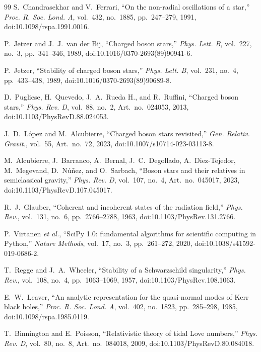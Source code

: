 \documentclass[aps,prd,preprint,onecolumn,nofootinbib,superscriptaddress,showkeys]{revtex4-2}
\begin{document}
\begin{thebibliography}{99}
S.~Chandrasekhar and V.~Ferrari,
``On the non-radial oscillations of a star,''
\emph{Proc. R. Soc. Lond. A}, vol.~432, no.~1885, pp.~247--279, 1991,
doi:10.1098/rspa.1991.0016.

P.~Jetzer and J.~J.~van der Bij,
``Charged boson stars,''
\emph{Phys. Lett. B}, vol.~227, no.~3, pp.~341--346, 1989,
doi:10.1016/0370-2693(89)90941-6.

P.~Jetzer,
``Stability of charged boson stars,''
\emph{Phys. Lett. B}, vol.~231, no.~4, pp.~433--438, 1989,
doi:10.1016/0370-2693(89)90689-8.

D.~Pugliese, H.~Quevedo, J.~A.~Rueda H., and R.~Ruffini,
``Charged boson stars,''
\emph{Phys. Rev. D}, vol.~88, no.~2, Art.~no.~024053, 2013,
doi:10.1103/PhysRevD.88.024053.

J.~D.~L\'opez and M.~Alcubierre,
``Charged boson stars revisited,''
\emph{Gen. Relativ. Gravit.}, vol.~55, Art.~no.~72, 2023,
doi:10.1007/s10714-023-03113-8.

M.~Alcubierre, J.~Barranco, A.~Bernal, J.~C.~Degollado,
A.~Diez-Tejedor, M.~Megevand, D.~N\'u\~nez, and O.~Sarbach,
``Boson stars and their relatives in semiclassical gravity,''
\emph{Phys. Rev. D}, vol.~107, no.~4, Art.~no.~045017, 2023,
doi:10.1103/PhysRevD.107.045017.

R.~J.~Glauber,
``Coherent and incoherent states of the radiation field,''
\emph{Phys. Rev.}, vol.~131, no.~6, pp.~2766--2788, 1963,
doi:10.1103/PhysRev.131.2766.

P.~Virtanen \emph{et al.},
``SciPy 1.0: fundamental algorithms for scientific computing in Python,''
\emph{Nature Methods}, vol.~17, no.~3, pp.~261--272, 2020,
doi:10.1038/s41592-019-0686-2.

T.~Regge and J.~A.~Wheeler,
``Stability of a Schwarzschild singularity,''
\emph{Phys. Rev.}, vol.~108, no.~4, pp.~1063--1069, 1957,
doi:10.1103/PhysRev.108.1063.

E.~W.~Leaver,
``An analytic representation for the quasi-normal modes of Kerr black holes,''
\emph{Proc. R. Soc. Lond. A}, vol.~402, no.~1823, pp.~285--298, 1985,
doi:10.1098/rspa.1985.0119.

T.~Binnington and E.~Poisson,
``Relativistic theory of tidal Love numbers,''
\emph{Phys. Rev. D}, vol.~80, no.~8, Art.~no.~084018, 2009,
doi:10.1103/PhysRevD.80.084018.


\end{thebibliography}
\end{document}
